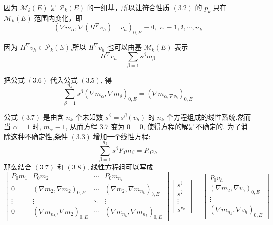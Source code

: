     因为 $\mathcal M _k(E)$ 是 $\mathcal P_k(E)$ 的一组基，所以让符合性质 $(3.2)$ 的 $p_k$ 只在 $\mathcal M _k(E)$ 范围内变化，即 \\
    \begin{equation}
    (\nabla m_{\alpha}, \nabla(\Pi^{\nabla}v_h) - v_h)_{0,E} = 0,\,\ \alpha = 1,2,\cdots, n_k
    \end{equation}
    
    因为 $\Pi^{\nabla}v_h \in \mathcal P_k(E)$,所以 $\Pi^{\nabla}v_h$ 也可以由基 $\mathcal M_k(E)$ 表示\\
    \begin{equation}
    \Pi^\nabla v_h = \sum_{\beta = 1}s^{\beta}m_\beta
    \end{equation}
    
    把公式 $(3.6)$ 代入公式 $(3.5)$, 得 \\
    \begin{equation}
    \sum_{\beta = 1}^{n_k}s^{\beta}(\nabla m_{\alpha},\nabla m_{\beta})_{0,E} = (\nabla m_{\alpha, \nabla v_h})_{0,E}
    \end{equation}
    
    公式 $(3.7)$ 是由含 $n_k$ 个未知数 $s^{\beta} = s^{\beta}(v_h)$ 的 $n_k$ 个方程组成的线性系统.然而当 $\alpha = 1$ 时, $m_{\alpha} \equiv 1$, 从而方程 $3.7$ 变为 $0 = 0$, 使得方程的解是不确定的. 为了消除这种不确定性,条件 $(3.3)$ 增加一个线性方程: \\
    \begin{equation}
    \sum_{\beta = 1}^{n_k}s^{\beta}P_0m_{\beta} = P_0v_h
    \end{equation}
    那么结合 $(3.7)$ 和 $(3.8)$, 线性方程组可以写成 \\
    \begin{equation*}
    \left[ \begin{array}{cccc}
    P_0m_1 & P_0m_2  &\cdots&P_0m_{n_k} \\
    0 & (\nabla m_2,\nabla m_2)_{0,E} & \cdots & (\nabla m_2,\nabla m_{n_k})_{0,E} \\
    \vdots & \vdots & \ddots & \vdots\\
    0& (\nabla m_{n_k},\nabla m_2)_{0,E} & \cdots & (\nabla m_{n_k},\nabla m_{n_k})_{0,E}
    \end{array} \right]
    \left[ \begin{array}{c}
    s^1\\
    s^2\\
    \vdots\\
    s^{n_k}
    \end{array} \right]
    = \left[\begin{array}{c}
    P_0v_h\\
    (\nabla m_2,\nabla v_h)_{0,E} \\
    \vdots\\
    (\nabla m_{n_k},\nabla v_h)_{0,E} 
    \end{array}\right]
    \end{equation*}
    
